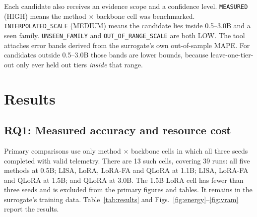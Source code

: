 \documentclass[conference]{IEEEtran}
\begin{document}
Each candidate also receives an evidence scope and a confidence level.
\texttt{MEASURED} (HIGH) means the method $\times$ backbone cell was benchmarked.
\texttt{INTERPOLATED\_SCALE} (MEDIUM) means the candidate lies inside 0.5--3.0B and a seen
family. \texttt{UNSEEN\_FAMILY} and \texttt{OUT\_OF\_RANGE\_SCALE} are both LOW. The tool
attaches error bands derived from the surrogate's own out-of-sample MAPE. For candidates
outside 0.5--3.0B those bands are lower bounds, because leave-one-tier-out only ever held
out tiers \emph{inside} that range. %

\section{Results}

\subsection{RQ1: Measured accuracy and resource cost}

Primary comparisons use only method $\times$ backbone cells in which all three seeds completed
with valid telemetry. There are 13 such cells, covering 39 runs: all five methods at 0.5B;
LISA, LoRA, LoRA-FA and QLoRA at 1.1B; LISA, LoRA-FA and QLoRA at 1.5B; and QLoRA at 3.0B.
The 1.5B LoRA cell has fewer than three seeds and is excluded from the primary figures and
tables. It remains in the surrogate's training data. %
Table~\ref{tab:results} and Figs.~\ref{fig:energy}--\ref{fig:vram} report the results.
\end{document}
